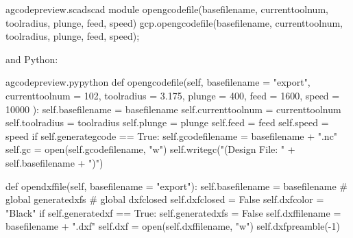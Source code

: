 \documentclass{ltxdoc}
\begin{document}
 
\lstset{firstnumber=\thegcpscad}
\begin{writecode}{a}{gcodepreview.scad}{scad}
module opengcodefile(basefilename, currenttoolnum, toolradius, plunge, feed, speed) {
    gcp.opengcodefile(basefilename, currenttoolnum, toolradius, plunge, feed, speed);
}

\end{writecode}
\addtocounter{gcpscad}{4}

\noindent and Python:

\lstset{firstnumber=\thegcpy}
\begin{writecode}{a}{gcodepreview.py}{python}
    def opengcodefile(self, basefilename = "export", 
                      currenttoolnum = 102, 
                      toolradius = 3.175, 
                      plunge = 400, 
                      feed = 1600, 
                      speed = 10000
                      ):
        self.basefilename = basefilename
        self.currenttoolnum = currenttoolnum
        self.toolradius = toolradius
        self.plunge = plunge
        self.feed = feed
        self.speed = speed
        if self.generategcode == True:
            self.gcodefilename = basefilename + ".nc"
            self.gc = open(self.gcodefilename, "w")
            self.writegc("(Design File: " + self.basefilename + ")")

    def opendxffile(self, basefilename = "export"): 
        self.basefilename = basefilename
#        global generatedxfs
#        global dxfclosed
        self.dxfclosed = False
        self.dxfcolor = "Black"
        if self.generatedxf == True:
            self.generatedxfs = False
            self.dxffilename = basefilename + ".dxf"
            self.dxf = open(self.dxffilename, "w")
            self.dxfpreamble(-1)


\end{writecode}
\end{document}
